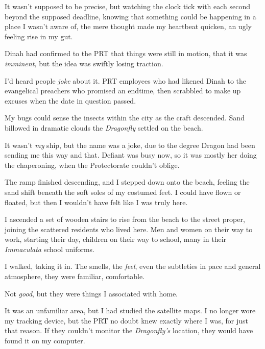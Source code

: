 It wasn't supposed to be precise, but watching the clock tick with each second beyond the supposed deadline, knowing that something could be happening in a place I wasn't aware of, the mere thought made my heartbeat quicken, an ugly feeling rise in my gut.



Dinah had confirmed to the PRT that things were still in motion, that it was \emph{imminent, }but the idea was swiftly losing traction.



I'd heard people \emph{joke} about it.  PRT employees who had likened Dinah to the evangelical preachers who promised an endtime, then scrabbled to make up excuses when the date in question passed.



My bugs could sense the insects within the city as the craft descended.  Sand billowed in dramatic clouds the \emph{Dragonfly} settled on the beach.



It wasn't\emph{ my} ship, but the name was a joke, due to the degree Dragon had been sending me this way and that.  Defiant was busy now, so it was mostly her doing the chaperoning, when the Protectorate couldn't oblige.



The ramp finished descending, and I stepped down onto the beach, feeling the sand shift beneath the soft soles of my costumed feet.  I could have flown or floated, but then I wouldn't have felt like I was truly here.



I ascended a set of wooden stairs to rise from the beach to the street proper, joining the scattered residents who lived here.  Men and women on their way to work, starting their day, children on their way to school, many in their \emph{Immaculata} school uniforms.



I walked, taking it in.  The smells, the \emph{feel}, even the subtleties in pace and general atmosphere, they were familiar, comfortable.



Not \emph{good}, but they were things I associated with home.



It was an unfamiliar area, but I had studied the satellite maps.  I no longer wore my tracking device, but the PRT no doubt knew exactly where I was, for just that reason.  If they couldn't monitor the \emph{Dragonfly's} location, they would have found it on my computer.



